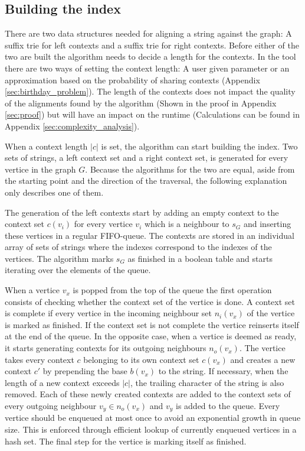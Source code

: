 \documentclass[thesis.tex]{subfiles}
\begin{document}
\subsection{Building the index}
There are two data structures needed for aligning a string against the graph: A suffix trie for left contexts and a suffix trie for right contexts. Before either of the two are built the algorithm needs to decide a length for the contexts. In the tool there are two ways of setting the context length: A user given parameter or an approximation based on the probability of sharing contexts (Appendix \ref{sec:birthday_problem}). The length of the contexts does not impact the quality of the alignments found by the algorithm (Shown in the proof in Appendix \ref{sec:proof}) but will have an impact on the runtime (Calculations can be found in Appendix \ref{sec:complexity_analysis}).\\
\par\noindent
When a context length $|c|$ is set, the algorithm can start building the index. Two sets of strings, a left context set and a right context set, is generated for every vertice in the graph $G$. Because the algorithms for the two are equal, aside from the starting point and the direction of the traversal, the following explanation only describes one of them.\\
\par\noindent
The generation of the left contexts start by adding an empty context to the context set $c(v_i)$ for every vertice $v_i$ which is a neighbour to $s_G$ and inserting these vertices in a regular FIFO-queue. The contexts are stored in an individual array of sets of strings where the indexes correspond to the indexes of the vertices. The algorithm marks $s_G$ as finished in a boolean table and starts iterating over the elements of the queue.\\
\par\noindent
When a vertice $v_x$ is popped from the top of the queue the first operation consists of checking whether the context set of the vertice is done. A context set is complete if every vertice in the incoming neighbour set $n_i(v_x)$ of the vertice is marked as finished. If the context set is not complete the vertice reinserts itself at the end of the queue. In the opposite case, when a vertice is deemed as ready, it starts generating contexts for its outgoing neighbours $n_o(v_x)$. The vertice takes every context $c$ belonging to its own context set $c(v_x)$ and creates a new context $c'$ by prepending the base $b(v_x)$ to the string. If necessary, when the length of a new context exceeds $|c|$, the trailing character of the string is also removed. Each of these newly created contexts are added to the context sets of every outgoing neighbour $v_y \in n_o(v_x)$ and $v_y$ is added to the queue. Every vertice should be enqueued at most once to avoid an exponential growth in queue size. This is enforced through efficient lookup of currently enqueued vertices in a hash set. The final step for the vertice is marking itself as finished.\\
\end{document}
